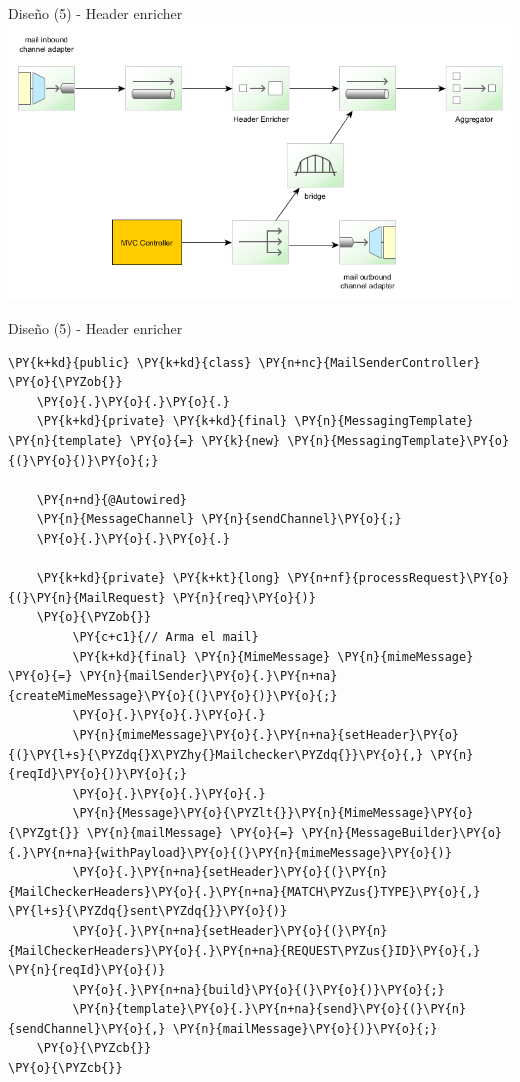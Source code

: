 \documentclass{beamer}
\begin{document}
\begin{frame}{Diseño (5) - Header enricher}
\includegraphics[width=1.0\linewidth]{sp-int-07}
\end{frame}


\begin{frame}[fragile]{Diseño (5) - Header enricher}
\begin{Verbatim}[fontsize=\tiny,commandchars=\\\{\}]
\PY{k+kd}{public} \PY{k+kd}{class} \PY{n+nc}{MailSenderController}
\PY{o}{\PYZob{}}
    \PY{o}{.}\PY{o}{.}\PY{o}{.}
    \PY{k+kd}{private} \PY{k+kd}{final} \PY{n}{MessagingTemplate} \PY{n}{template} \PY{o}{=} \PY{k}{new} \PY{n}{MessagingTemplate}\PY{o}{(}\PY{o}{)}\PY{o}{;}

    \PY{n+nd}{@Autowired}
    \PY{n}{MessageChannel} \PY{n}{sendChannel}\PY{o}{;}
    \PY{o}{.}\PY{o}{.}\PY{o}{.}

    \PY{k+kd}{private} \PY{k+kt}{long} \PY{n+nf}{processRequest}\PY{o}{(}\PY{n}{MailRequest} \PY{n}{req}\PY{o}{)}
    \PY{o}{\PYZob{}}
         \PY{c+c1}{// Arma el mail}
         \PY{k+kd}{final} \PY{n}{MimeMessage} \PY{n}{mimeMessage} \PY{o}{=} \PY{n}{mailSender}\PY{o}{.}\PY{n+na}{createMimeMessage}\PY{o}{(}\PY{o}{)}\PY{o}{;}
         \PY{o}{.}\PY{o}{.}\PY{o}{.}
         \PY{n}{mimeMessage}\PY{o}{.}\PY{n+na}{setHeader}\PY{o}{(}\PY{l+s}{\PYZdq{}X\PYZhy{}Mailchecker\PYZdq{}}\PY{o}{,} \PY{n}{reqId}\PY{o}{)}\PY{o}{;}
         \PY{o}{.}\PY{o}{.}\PY{o}{.}
         \PY{n}{Message}\PY{o}{\PYZlt{}}\PY{n}{MimeMessage}\PY{o}{\PYZgt{}} \PY{n}{mailMessage} \PY{o}{=} \PY{n}{MessageBuilder}\PY{o}{.}\PY{n+na}{withPayload}\PY{o}{(}\PY{n}{mimeMessage}\PY{o}{)}
         \PY{o}{.}\PY{n+na}{setHeader}\PY{o}{(}\PY{n}{MailCheckerHeaders}\PY{o}{.}\PY{n+na}{MATCH\PYZus{}TYPE}\PY{o}{,} \PY{l+s}{\PYZdq{}sent\PYZdq{}}\PY{o}{)}
         \PY{o}{.}\PY{n+na}{setHeader}\PY{o}{(}\PY{n}{MailCheckerHeaders}\PY{o}{.}\PY{n+na}{REQUEST\PYZus{}ID}\PY{o}{,} \PY{n}{reqId}\PY{o}{)}
         \PY{o}{.}\PY{n+na}{build}\PY{o}{(}\PY{o}{)}\PY{o}{;}
         \PY{n}{template}\PY{o}{.}\PY{n+na}{send}\PY{o}{(}\PY{n}{sendChannel}\PY{o}{,} \PY{n}{mailMessage}\PY{o}{)}\PY{o}{;}
    \PY{o}{\PYZcb{}}
\PY{o}{\PYZcb{}}
\end{Verbatim}
\end{frame}
\end{document}
